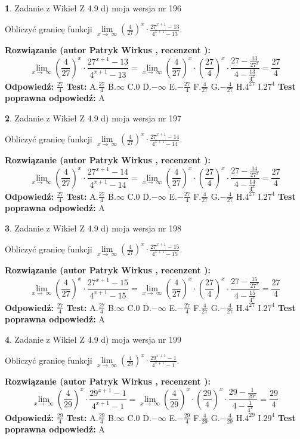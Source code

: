 \documentclass[12pt, a4paper]{article}
\theoremstyle{definition} %
\newtheorem{zad}{}
\newcommand{\zadStart}[1]{\begin{zad}#1\newline}
\newcommand{\zadStop}{\end{zad}}
\newcommand{\rozwStart}[2]{\noindent \textbf{Rozwiązanie (autor #1 , recenzent #2): }\newline}
\newcommand{\rozwStop}{\newline}
\newcommand{\odpStart}{\noindent \textbf{Odpowiedź:}\newline}
\newcommand{\odpStop}{\newline}
\newcommand{\testStart}{\noindent \textbf{Test:}\newline}
\newcommand{\testStop}{\newline}
\newcommand{\kluczStart}{\noindent \textbf{Test poprawna odpowiedź:}\newline}
\newcommand{\kluczStop}{\newline}
\begin{document}
\zadStart{Zadanie z Wikieł Z 4.9 d) moja wersja nr 196}


Obliczyć granicę funkcji  $\lim\limits_{x\to\ \infty}(\frac{4}{27})^{x}\cdot\frac{27^{x+1}-13}{4^{x+1}-13}$.
\zadStop
\rozwStart{Patryk Wirkus}{}
$$\lim\limits_{x\to\ \infty}(\frac{4}{27})^{x}\cdot\frac{27^{x+1}-13}{4^{x+1}-13}=\lim\limits_{x\to\ \infty}(\frac{4}{27})^{x}\cdot(\frac{27}{4})^{x} \cdot \frac{27-\frac{13}{27^{x}}}{4-\frac{13}{4^{x}}} = \frac{27}{4}$$
\rozwStop
\odpStart
$\frac{27}{4}$
\odpStop
\testStart
A.$\frac{27}{4}$ B.$\infty$ C.$0$ D.$-\infty$ E.$-\frac{27}{4}$
F.$\frac{4}{27}$ G.$-\frac{4}{27}$
H.$4^{27}$
I.$27^{4}$
\testStop
\kluczStart
A
\kluczStop



\zadStart{Zadanie z Wikieł Z 4.9 d) moja wersja nr 197}


Obliczyć granicę funkcji  $\lim\limits_{x\to\ \infty}(\frac{4}{27})^{x}\cdot\frac{27^{x+1}-14}{4^{x+1}-14}$.
\zadStop
\rozwStart{Patryk Wirkus}{}
$$\lim\limits_{x\to\ \infty}(\frac{4}{27})^{x}\cdot\frac{27^{x+1}-14}{4^{x+1}-14}=\lim\limits_{x\to\ \infty}(\frac{4}{27})^{x}\cdot(\frac{27}{4})^{x} \cdot \frac{27-\frac{14}{27^{x}}}{4-\frac{14}{4^{x}}} = \frac{27}{4}$$
\rozwStop
\odpStart
$\frac{27}{4}$
\odpStop
\testStart
A.$\frac{27}{4}$ B.$\infty$ C.$0$ D.$-\infty$ E.$-\frac{27}{4}$
F.$\frac{4}{27}$ G.$-\frac{4}{27}$
H.$4^{27}$
I.$27^{4}$
\testStop
\kluczStart
A
\kluczStop



\zadStart{Zadanie z Wikieł Z 4.9 d) moja wersja nr 198}


Obliczyć granicę funkcji  $\lim\limits_{x\to\ \infty}(\frac{4}{27})^{x}\cdot\frac{27^{x+1}-15}{4^{x+1}-15}$.
\zadStop
\rozwStart{Patryk Wirkus}{}
$$\lim\limits_{x\to\ \infty}(\frac{4}{27})^{x}\cdot\frac{27^{x+1}-15}{4^{x+1}-15}=\lim\limits_{x\to\ \infty}(\frac{4}{27})^{x}\cdot(\frac{27}{4})^{x} \cdot \frac{27-\frac{15}{27^{x}}}{4-\frac{15}{4^{x}}} = \frac{27}{4}$$
\rozwStop
\odpStart
$\frac{27}{4}$
\odpStop
\testStart
A.$\frac{27}{4}$ B.$\infty$ C.$0$ D.$-\infty$ E.$-\frac{27}{4}$
F.$\frac{4}{27}$ G.$-\frac{4}{27}$
H.$4^{27}$
I.$27^{4}$
\testStop
\kluczStart
A
\kluczStop



\zadStart{Zadanie z Wikieł Z 4.9 d) moja wersja nr 199}


Obliczyć granicę funkcji  $\lim\limits_{x\to\ \infty}(\frac{4}{29})^{x}\cdot\frac{29^{x+1}-1}{4^{x+1}-1}$.
\zadStop
\rozwStart{Patryk Wirkus}{}
$$\lim\limits_{x\to\ \infty}(\frac{4}{29})^{x}\cdot\frac{29^{x+1}-1}{4^{x+1}-1}=\lim\limits_{x\to\ \infty}(\frac{4}{29})^{x}\cdot(\frac{29}{4})^{x} \cdot \frac{29-\frac{1}{29^{x}}}{4-\frac{1}{4^{x}}} = \frac{29}{4}$$
\rozwStop
\odpStart
$\frac{29}{4}$
\odpStop
\testStart
A.$\frac{29}{4}$ B.$\infty$ C.$0$ D.$-\infty$ E.$-\frac{29}{4}$
F.$\frac{4}{29}$ G.$-\frac{4}{29}$
H.$4^{29}$
I.$29^{4}$
\testStop
\kluczStart
A
\kluczStop
\end{document}
